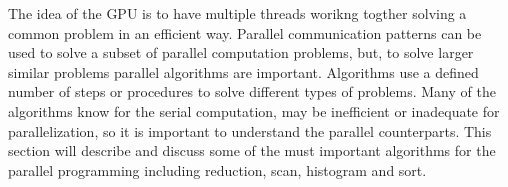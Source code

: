 The idea of the GPU is to have multiple threads worikng togther solving a common problem in an efficient way. Parallel communication patterns can be used to solve a subset of parallel computation problems, but, to solve larger similar problems parallel algorithms are important. Algorithms use a defined number of steps or procedures to solve different types of problems. Many of the algorithms know for the serial computation, may be inefficient or inadequate for parallelization, so it is important to understand the parallel counterparts. This section will describe and discuss some of the must important algorithms for the parallel programming including reduction, scan, histogram and sort.   